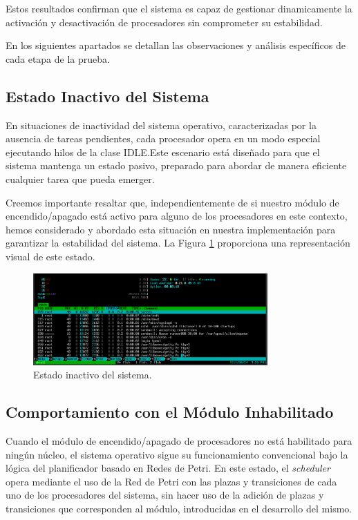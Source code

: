 Estos resultados confirman que el sistema es capaz de gestionar dinamicamente la activación y desactivación de procesadores sin comprometer su estabilidad.\par

En los siguientes apartados se detallan las observaciones y análisis específicos de cada etapa de la prueba.\par

\subsection{Estado Inactivo del Sistema}
En situaciones de inactividad del sistema operativo, caracterizadas por la ausencia de tareas pendientes, cada procesador opera en un modo especial ejecutando hilos de la clase IDLE.\@ Este escenario está diseñado para que el sistema mantenga un estado pasivo, preparado para abordar de manera eficiente cualquier tarea que pueda emerger.\par

Creemos importante resaltar que, independientemente de si nuestro módulo de encendido/apagado está activo para alguno de los procesadores en este contexto, hemos considerado y abordado esta situación en nuestra implementación para garantizar la estabilidad del sistema. La Figura \ref{fig:cpuOnOff-result-idle} proporciona una representación visual de este estado.\par

\begin{figure}[H]
    \centering
    \includegraphics[width=0.8\textwidth]{images/cpuOnOff-result-idle.png}
    \caption{Estado inactivo del sistema.}
    \label{fig:cpuOnOff-result-idle}
\end{figure}

\subsection{Comportamiento con el Módulo Inhabilitado}
Cuando el módulo de encendido/apagado de procesadores no está habilitado para ningún núcleo, el sistema operativo sigue su funcionamiento convencional bajo la lógica del planificador basado en Redes de Petri. En este estado, el \textit{scheduler} opera mediante el uso de la Red de Petri  con las plazas y transiciones de cada uno de los procesadores del sistema, sin hacer uso de la adición de plazas y transiciones que corresponden al módulo, introducidas en el desarrollo del mismo.\par

